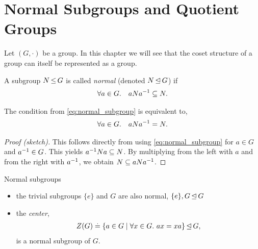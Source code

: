 
\chapter{Normal Subgroups and Quotient Groups}
Let $(G,\cdot)$ be a group. In this chapter we will see that the coset structure of a group can itself be represented as a group.

\begin{defn}
A subgroup $N \operatorname*{\leq} G$ is called \emph{normal} (denoted $N \operatorname*{\trianglelefteq} G$) if \begin{align}
    \forall a \in G.\quad a N a^{-1} \subseteq N. \label{eq:normal_subgroup}
\end{align}
\end{defn}

\begin{rmk}\label{rmk:normal_subgroup}
The condition from \cref{eq:normal_subgroup} is equivalent to, \begin{align}
    \forall a \in G.\quad a N a^{-1} = N.
\end{align}
\end{rmk} \begin{proof}[Proof (sketch)]
This follows directly from using \cref{eq:normal_subgroup} for $a \in G$ and $a^{-1} \in G$. This yields $a^{-1} N a \subseteq N$. By multiplying from the left with $a$ and from the right with $a^{-1}$, we obtain $N \subseteq a N a^{-1}$.
\end{proof}

\begin{ex}{Normal subgroups}{}
\begin{itemize}
    \item the trivial subgroups $\{e\}$ and $G$ are also normal, $\{e\}, G \operatorname*{\trianglelefteq} G$
    \item the \emph{center}, \begin{align}
        Z(G) \overset{.}{=} \{a \in G \mid \forall x \in G.\ ax = xa\} \operatorname*{\trianglelefteq} G,
    \end{align} is a normal subgroup of $G$.
\end{itemize}
\end{ex}

